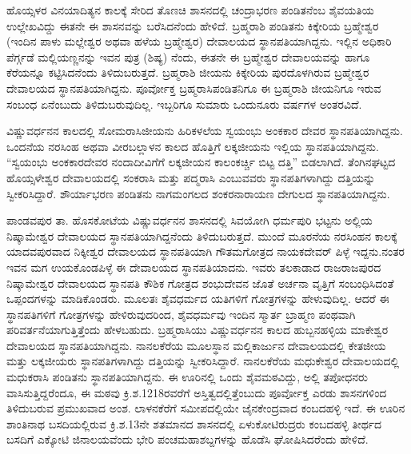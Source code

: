 ಹೊಯ್ಸಳರ ವಿನಯಾದಿತ್ಯನ ಕಾಲಕ್ಕೆ ಸೇರಿದ ತೊಣಚಿ ಶಾಸನದಲ್ಲಿ ಚಂದ್ರಾಭರಣ ಪಂಡಿತನೆಂಬ ಶೈವಯತಿಯ ಉಲ್ಲೇಖವಿದ್ದು ಈತನೇ ಈ ಶಾಸನವನ್ನು ಬರೆಸಿದನೆಂದು ಹೇಳಿದೆ. ಬ್ರಹ್ಮರಾಶಿ ಪಂಡಿತನು ಕಿಕ್ಕೇರಿಯ ಬ್ರಹ್ಮೇಶ್ವರ (ಇಂದಿನ ಪಾಳು ಮಲ್ಲೇಶ್ವರ ಅಥವಾ ಹಳೆಯ ಬ್ರಹ್ಮೇಶ್ವರ) ದೇವಾಲಯದ ಸ್ಥಾನಪತಿಯಾಗಿದ್ದನು. ಇಲ್ಲಿನ ಅಧಿಕಾರಿ ಪೆರ್ಗ್ಗಡೆ ಮಲ್ಲಿಯಣ್ಣನನ್ನು ಇವನ ಪುತ್ರ (ಶಿಷ್ಯ) ನೆಂದು, ಈತನೇ ಈ ಬ್ರಹ್ಮೇಶ್ವರ ದೇವಾಲಯವನ್ನು ಹಾಗೂ ಕೆರೆಯನ್ನೂ ಕಟ್ಟಿಸಿದನೆಂದು ತಿಳಿದುಬರುತ್ತದೆ. ಬ್ರಹ್ಮರಾಶಿ ಜೀಯನು ಕಿಕ್ಕೇರಿಯ ಪುರದೊಳಗಿರುವ ಬ್ರಹ್ಮೇಶ್ವರ ದೇವಾಲಯದ ಸ್ಥಾನಪತಿಯಾಗಿದ್ದನು. ಪೂರ್ವೋಕ್ತ ಬ್ರಹ್ಮರಾಸಿಪಂಡಿತನಿಗೂ ಈ ಬ್ರಹ್ಮರಾಶಿ ಜೀಯನಿಗೂ ಇರುವ ಸಂಬಂಧ ಏನೆಂಬುದು ತಿಳಿದುಬರುವುದಿಲ್ಲ. ಇಬ್ಬರಿಗೂ ಸುಮಾರು ಒಂದುನೂರು ವರ್ಷಗಳ ಅಂತರವಿದೆ.

ವಿಷ್ಣುವರ್ಧನನ ಕಾಲದಲ್ಲಿ ಸೋಮರಾಸಿಜೀಯನು ಹಿರಿಕಳಲೆಯ ಸ್ವಯಂಭು ಅಂಕಕಾರ ದೇವರ ಸ್ಥಾನಪತಿಯಾಗಿ\-ದ್ದನು. ಒಂದನೆಯ ನರಸಿಂಹ ಅಥವಾ ವೀರಬಲ್ಲಾಳನ ಕಾಲದ ಹೊತ್ತಿಗೆ ಲಕ್ಕಜೀಯನು ಇಲ್ಲಿಯ ಸ್ಥಾನಪತಿಯಾಗಿದ್ದನು. “ಸ್ವಯಂಭು ಅಂಕಕಾರದೇವರ ನಂದಾದೀವಿಗೆಗೆ ಲಕ್ಕಜೀಯನ ಕಾಲಂಕರ್ಚ್ಚಿ ಬಿಟ್ಟ ದತ್ತಿ” ಬಿಡಲಾಗಿದೆ. ತೆಂಗಿನಘಟ್ಟದ ಹೊಯ್ಸಳೇಶ್ವರ ದೇವಾಲಯದಲ್ಲಿ ಸಂಕರಾಸಿ ಮತ್ತು ಪದ್ಮರಾಸಿ ಎಂಬುವವರು ಸ್ಥಾನಪತಿಗಳಾಗಿದ್ದು ದತ್ತಿಯನ್ನು ಸ್ವೀಕರಿಸಿದ್ದಾರೆ. ಶೌರ್ಯಾಭರಣ ಪಂಡಿತನು ನಾಗಮಂಗಲದ ಶಂಕರನಾರಾಯಣ ದೇಗುಲದ ಸ್ಥಾನಪತಿಯಾಗಿದ್ದನು.

ಪಾಂಡವಪುರ ತಾ. ಹೊಸಕೋಟೆಯ ವಿಷ್ಣುವರ್ಧನನ ಶಾಸನದಲ್ಲಿ ಸಿವಯೋಗಿ ಧರ್ಮಪುರಿ ಭಟ್ಟನು ಅಲ್ಲಿಯ ನಿಷ್ಕಾಮೇಶ್ವರ ದೇವಾಲಯದ ಸ್ಥಾನಪತಿಯಾಗಿದ್ದನೆಂದು ತಿಳಿದುಬರುತ್ತದೆ. ಮುಂದೆ ಮೂರನೆಯ ನರಸಿಂಹನ ಕಾಲಕ್ಕೆ ಯಾದವಪುರವಾದ ನಿಕ್ಕೀಶ್ವರ ದೇವಾಲಯದ ಸ್ಥಾನಪತಿಯಾಗಿ ಗೌತಮಗೋತ್ರದ ನಾಯಕದೇವರ್​ ಪಿಳ್ಳೆ ಇದ್ದನು.ನಂತರ ಇವನ ಮಗ ಉಯಕೊಂಡಪಿಳ್ಳೆ ಈ ದೇವಾಲಯದ ಸ್ಥಾನಪತಿಯಾದನು. ಇವರು ತಲಕಾಡಾದ ರಾಜರಾಜಪುರದ ನಿಷ್ಕಾಮೇಶ್ವರ ದೇವಾಲಯದ ಸ್ಥಾನಪತಿ ಕೌಶಿಕ ಗೋತ್ರದ ಶಂಭುದೇವನ ಜೊತೆ ಅರ್ಚನಾ ವೃತ್ತಿಗೆ ಸಂಬಂಧಿಸಿದಂತೆ ಒಪ್ಪಂದಗಳನ್ನು ಮಾಡಿಕೊಂಡರು. ಮೂಲತಃ ಶೈವಧರ್ಮದ ಯತಿಗಳಿಗೆ ಗೋತ್ರಗಳನ್ನು ಹೇಳುವುದಿಲ್ಲ. ಆದರೆ ಈ ಸ್ಥಾನಪತಿಗಳಿಗೆ ಗೋತ್ರಗಳನ್ನು ಹೇಳಿರುವುದರಿಂದ, ಶೈವಧರ್ಮವು ಇಂದಿನ ಸ್ಮಾರ್ತ ಬ್ರಾಹ್ಮಣ ಪಂಥವಾಗಿ ಪರಿವರ್ತನೆಯಾಗು\-ತ್ತಿತ್ತೆಂದು ಹೇಳಬಹುದು. ಬ್ರಹ್ಮರಾಸಿಯು ವಿಷ್ಣುವರ್ಧನನ ಕಾಲದ ಹುಬ್ಬನಹಳ್ಳಿಯ ಮಾಕೇಶ್ವರ ದೇವಾಲಯದ ಸ್ಥಾನಪತಿ\-ಯಾಗಿದ್ದನು. ನಾನಲಕೆರೆಯ ಮೂಲಸ್ಥಾನ ಮಲ್ಲಿಕಾರ್ಜುನ ದೇವಾಲಯದಲ್ಲಿ ಕೇತಜೀಯ ಮತ್ತು ಲಕ್ಕಜೀಯರು ಸ್ಥಾನಪತಿಗಳಾಗಿದ್ದು ದತ್ತಿಯನ್ನು ಸ್ವೀಕರಿಸಿದ್ದಾರೆ. ನಾನಲಕೆರೆಯ ಮಧುಕೇಶ್ವರ ದೇವಾಲಯದಲ್ಲಿ ಮಧುಕರಾಸಿ ಪಂಡಿತನು ಸ್ಥಾನಪತಿಯಾಗಿ\-ದ್ದನು. ಈ ಊರಿನಲ್ಲಿ ಒಂದು ಶೈವಮಠವಿದ್ದು, ಅಲ್ಲಿ ತಪೋಧನರು ವಾಸಿಸುತ್ತಿದ್ದರೆಂದೂ, ಈ ಮಠವು ಕ್ರಿ.ಶ.1218ರವರೆಗೆ ಅಸ್ತಿತ್ವದಲ್ಲಿತ್ತೆಂಬುದು ಪೂರ್ವೋಕ್ತ ಎರಡು ಶಾಸನಗಳಿಂದ ತಿಳಿದುಬರುವ ಪ್ರಮುಖವಾದ ಅಂಶ. ಲಾಳನಕೆರೆಗೆ ಸಮೀಪದಲ್ಲಿಯೇ ಜೈನಕೇಂದ್ರವಾದ ಕಂಬದಹಳ್ಳಿ ಇದೆ. ಈ ಊರಿನ ಶಾಂತಿನಾಥ ಬಸದಿಯಲ್ಲಿರುವ ಕ್ರಿ.ಶ.13ನೇ ಶತಮಾನದ ಶಾಸನದಲ್ಲಿ ಏಳುಕೋಟಿರುದ್ರರು ಕಂಬದಹಳ್ಳಿ ತೀರ್ಥದ ಬಸದಿಗೆ ಎಕ್ಕೋಟಿ ಜಿನಾಲಯವೆಂದು ಭೇರಿ ಪಂಚಮಹಾಶಬ್ದಗಳನ್ನು ಹೊಡೆಸಿ ಘೋಷಿಸಿದರೆಂದು ಹೇಳಿದೆ.

